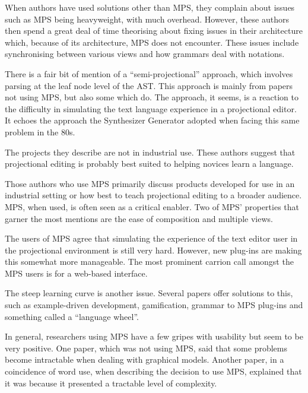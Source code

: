 When authors have used solutions other than MPS, they complain about issues such as MPS being heavyweight, with much overhead.
However, these authors then spend a great deal of time theorising about fixing issues in their architecture which, because of its architecture, MPS does not encounter.
These issues include synchronising between various views and how grammars deal with notations.

There is a fair bit of mention of a ``semi-projectional'' approach, which involves parsing at the leaf node level of the AST.
This approach is mainly from papers not using MPS, but also some which do.
The approach, it seems, is a reaction to the difficulty in simulating the text language experience in a projectional editor. 
It echoes the approach the Synthesizer Generator adopted when facing this same problem in the 80s.

The projects they describe are not in industrial use.
These authors suggest that projectional editing is probably best suited to helping novices learn a language. 

Those authors who use MPS primarily discuss products developed for use in an industrial setting or how best to teach projectional editing to a broader audience.
MPS, when used, is often seen as a critical enabler.
Two of MPS' properties that garner the most mentions are the ease of composition and multiple views.

The users of MPS agree that simulating the experience of the text editor user in the projectional environment is still very hard.
However, new plug-ins are making this somewhat more manageable.
The most prominent carrion call amongst the MPS users is for a web-based interface.

The steep learning curve is another issue.
Several papers offer solutions to this, such as example-driven development, gamification, grammar to MPS plug-ins and something called a ``language wheel''.

In general, researchers using MPS have a few gripes with usability but seem to be very positive.
One paper, which was not using MPS, said that some problems become intractable when dealing with graphical models.
Another paper, in a coincidence of word use, when describing the decision to use MPS, explained that it was because it presented a tractable level of complexity. 
